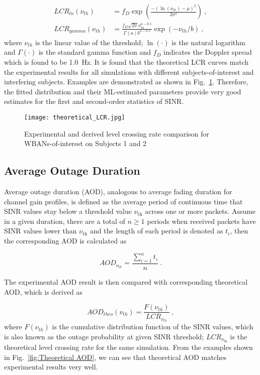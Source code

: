 \documentclass[12pt,draftcls,a4paper,onecolumn,journal]{IEEEtran}
\begin{document}
\begin{align}
  LCR_{ln}(\nu_{th}) &= f_D\exp\left(\frac{-(\ln(\nu_{th})-\mu)^2}{2\sigma^2}\right)~, \\
  LCR_{gamma}(\nu_{th}) &= \frac{f_D\sqrt{2\pi}\nu_{th}^{a-0.5}}{\Gamma(a)b^{a-0.5}}\exp(-\nu_{th}/b)~,
\end{align}
where $\nu_{th}$ is the linear value of the threshold; $\ln(\cdot)$ is the natural logarithm and $\Gamma(\cdot)$ is the standard gamma function and $f_D$ indicates the Doppler spread which is found to be 1.0~Hz. It is found that the theoretical LCR curves match the experimental results for all simulations with different subjects-of-interest and interfering subjects. Examples are demonstrated as shown in Fig.~\ref{fig: Sample Theoretical LCR fit for Subject 1 an 2}. Therefore, the fitted distribution and their ML-estimated parameters provide very good estimates for the first and second-order statistics of SINR.

\begin{figure}[]
\centering
\texttt{[image: theoretical\_LCR.jpg]}
\caption{Experimental and derived level crossing rate comparison for WBANs-of-interest on Subjects 1 and 2}
\label{fig: Sample Theoretical LCR fit for Subject 1 an 2}
\end{figure}



\subsection{Average Outage Duration}
Average outage duration (AOD), analogous to average fading duration for channel gain profiles, is defined as the average period of continuous time that SINR values stay below a threshold value $\nu_{\mathrm{th}}$ across one or more packets. Assume in a given duration, there are a total of $n\geq1$ periods when received packets have SINR values lower than $\nu_{\mathrm{th}}$ and the length of each period is denoted as $t_i$, then the corresponding AOD is calculated as

\begin{equation}
AOD_{\nu_{th}} = \frac{\sum\limits_{i = 1}^{n}{t_{i}}}{n}~.
\label{equ:Average fading duration}
\end{equation}

The experimental AOD result is then compared with corresponding theoretical AOD, which is derived as

\begin{equation}
  AOD_{theo}(\nu_{th}) = \frac{F(\nu_{th})}{LCR_{\nu_{th}}}~,
\end{equation}
where $F(\nu_{th})$ is the cumulative distribution function of the SINR values, which is also known as the outage probability at given SINR threshold; $LCR_{\nu_{\mathrm{th}}}$ is the theoretical level crossing rate for the same simulation. From the examples shown in Fig.~\ref{fig:Theoretical AOD}, we can see that theoretical AOD matches experimental results very well.
\end{document}
